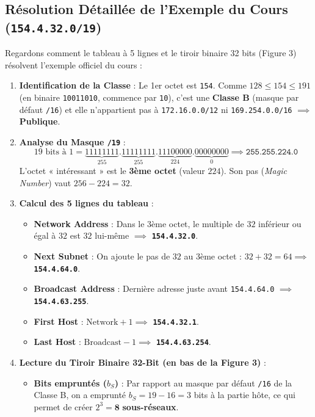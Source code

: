 \documentclass[11pt,a4paper]{article}
\begin{document}
\subsection{Résolution Détaillée de l'Exemple du Cours (\texttt{154.4.32.0/19})}
Regardons comment le tableau à 5 lignes et le tiroir binaire 32 bits (Figure 3) résolvent l'exemple officiel du cours :
\begin{enumerate}
    \item \textbf{Identification de la Classe} : Le 1er octet est \texttt{154}. Comme $128 \le 154 \le 191$ (en binaire \texttt{10011010}, commence par \texttt{10}), c'est une \textbf{Classe B} (masque par défaut \texttt{/16}) et elle n'appartient pas à \texttt{172.16.0.0/12} ni \texttt{169.254.0.0/16} $\implies$ \textbf{Publique}.
    \item \textbf{Analyse du Masque \texttt{/19}} :
    $$\text{19 bits à 1} = \underbrace{11111111}_{255}.\underbrace{11111111}_{255}.\underbrace{11100000}_{224}.\underbrace{00000000}_{0} \implies \texttt{255.255.224.0}$$
    L'octet « intéressant » est le \textbf{3ème octet} (valeur $224$). Son pas (\textit{Magic Number}) vaut $256 - 224 = 32$.
    \item \textbf{Calcul des 5 lignes du tableau} :
    \begin{itemize}
        \item \textbf{Network Address} : Dans le 3ème octet, le multiple de $32$ inférieur ou égal à $32$ est $32$ lui-même $\implies$ \textbf{\texttt{154.4.32.0}}.
        \item \textbf{Next Subnet} : On ajoute le pas de $32$ au 3ème octet : $32 + 32 = 64 \implies$ \textbf{\texttt{154.4.64.0}}.
        \item \textbf{Broadcast Address} : Dernière adresse juste avant \texttt{154.4.64.0} $\implies$ \textbf{\texttt{154.4.63.255}}.
        \item \textbf{First Host} : $\text{Network} + 1 \implies$ \textbf{\texttt{154.4.32.1}}.
        \item \textbf{Last Host} : $\text{Broadcast} - 1 \implies$ \textbf{\texttt{154.4.63.254}}.
    \end{itemize}
    \item \textbf{Lecture du Tiroir Binaire 32-Bit (en bas de la Figure 3)} :
    \begin{itemize}
        \item \textbf{Bits empruntés ($b_S$)} : Par rapport au masque par défaut \texttt{/16} de la Classe B, on a emprunté $b_S = 19 - 16 = 3$ bits à la partie hôte, ce qui permet de créer $2^3 = \mathbf{8}$ \textbf{sous-réseaux}.

\end{itemize}
\end{enumerate}
\end{document}
